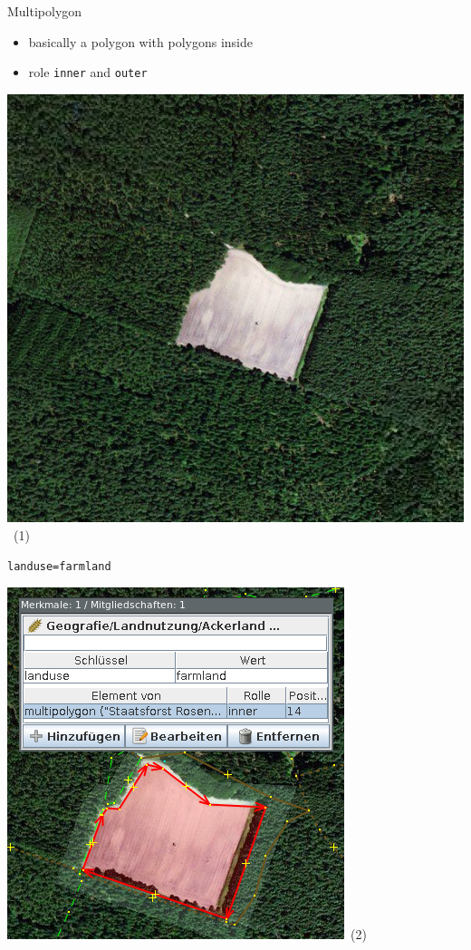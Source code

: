 \documentclass{beamer}
\begin{document}
	\begin{frame}{Multipolygon}
		\begin{itemize}
			\item basically a polygon with polygons inside
			\item role \texttt{inner} and \texttt{outer}
		\end{itemize}
		
		\vfill
		
		\begin{center}
			\begin{minipage}[b][0.6\textheight][c]{0.4\linewidth}
				\centering
				\includegraphics[width=0.8\linewidth,height=0.8\textheight,keepaspectratio]{images/multipolygon.png}~\tiny{(1)}
			\end{minipage}
			\begin{minipage}[b][0.6\textheight][c]{0.3\linewidth}
				\texttt{landuse=farmland}
				\begin{center}
					\includegraphics[width=\linewidth,height=\textheight,keepaspectratio]{images/multipolygon_josm.png}~\tiny{(2)}

\end{center}
\end{minipage}
\end{center}
\end{frame}
\end{document}
